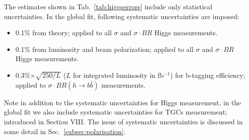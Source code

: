 
The estimates shown in Tab.~\ref{tab:higgserrors} include only
statistical uncertainties. In the global fit,  following systematic uncertainties are imposed:
\begin{itemize}
\item 0.1\% from theory; applied to all $\sigma$ and $\sigma\cdot BR$ Higgs measurements.
\item 0.1\% from luminosity and beam polarization; 
applied to all $\sigma$ and $\sigma\cdot BR$ Higgs measurements.
\item 0.3\%$\times\sqrt{250/L}$ ($L$ for integrated luminosity in fb$^{-1}$) for b-tagging efficiency; 
applied to $\sigma\cdot BR(h\to b\bar{b})$ measurements.
\end{itemize}
Note in addition to the systematic uncertainties for Higgs measurement, 
in the global fit we also include systematic  uncertainties for TGCs
measurement; introduced in Section VIII.  The issue of systematic
uncertainties is discussed in some detail in Sec.~\ref{subsec:polarisation}.
